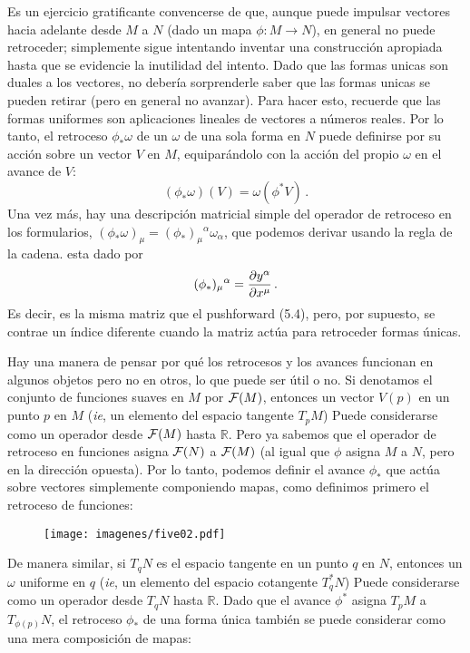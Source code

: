 \documentclass[11pt,b5paper,openany,twoside]{book}
\newcommand{\R}{\mathbb{R}}
\begin{document}
Es un ejercicio gratificante convencerse de que, aunque puede impulsar vectores hacia adelante desde $M$ a $N$ (dado un mapa $\phi: M\rightarrow N$), en general no puede retroceder; simplemente sigue intentando inventar una construcción apropiada hasta que se evidencie la inutilidad del intento.
Dado que las formas unicas son duales a los vectores, no debería sorprenderle saber que las formas unicas se pueden retirar (pero en general no avanzar).
Para hacer esto, recuerde que las formas uniformes son aplicaciones lineales de vectores a números reales.
Por lo tanto, el retroceso $\phi_*\omega$ de un $\omega$ de una sola forma en $N$ puede definirse por su acción sobre un vector $V$ en $M$, equiparándolo con la acción del propio $\omega$ en el avance de $V$:
\begin{equation}
(\phi_*\omega)(V)=\omega(\phi^*V)\,.\label{5.5}
\end{equation}
Una vez más, hay una descripción matricial simple del operador de retroceso en los formularios, $(\phi_*\omega)_\mu =(\phi_*)_\mu{}^\alpha \omega_\alpha$, que podemos derivar usando la regla de la cadena.
esta dado por
\begin{equation}
(\phi_*)_\mu{}^\alpha = {{\partial y^\alpha}\over{\partial x^\mu}}
\,.\label{5.6}
\end{equation}
Es decir, es la misma matriz que el pushforward (5.4), pero, por supuesto, se contrae un índice diferente cuando la matriz actúa para retroceder formas únicas.

Hay una manera de pensar por qué los retrocesos y los avances funcionan en algunos objetos pero no en otros, lo que puede ser útil o no.
Si denotamos el conjunto de funciones suaves en $M$ por ${\cal F}(M)$, entonces un vector $V(p)$ en un punto $p$ en $M$ ({\it ie}, un elemento del espacio tangente $T_pM$) Puede considerarse como un operador desde ${\cal F}(M)$ hasta $\R$.
Pero ya sabemos que el operador de retroceso en funciones asigna ${\cal F}(N)$ a ${\cal F}(M)$ (al igual que $\phi$ asigna $M$ a $N$, pero en la dirección opuesta).
Por lo tanto, podemos definir el avance $\phi_*$ que actúa sobre vectores simplemente componiendo mapas, como definimos primero el retroceso de funciones:

\begin{figure}[h]
\centering
\texttt{[image: imagenes/five02.pdf]}
\end{figure}

\noindent
De manera similar, si $T_qN$ es el espacio tangente en un punto $q$ en $N$, entonces un $\omega$ uniforme en $q$ ({\it ie}, un elemento del espacio cotangente $T_q^*N$) Puede considerarse como un operador desde $T_qN$ hasta $\R$.
Dado que el avance $\phi^*$ asigna $T_pM$ a $T_{\phi(p)}N$, el retroceso $\phi_*$ de una forma única también se puede considerar como una mera composición de mapas:
\end{document}
